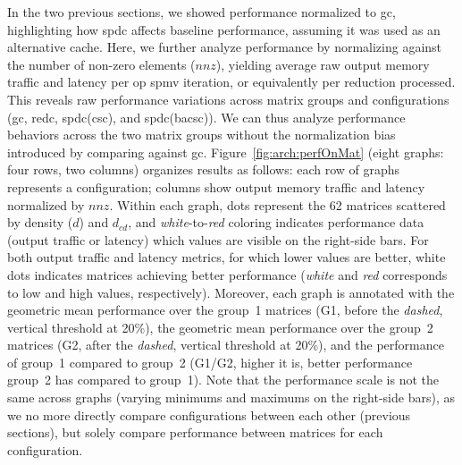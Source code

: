 In the two previous sections, we showed performance normalized to \acrshort{gc}, highlighting how \acrlong{spdc} affects baseline performance, assuming it was used as an alternative cache.
Here, we further analyze performance by normalizing against the number of non-zero elements ($\mathit{nnz}$), yielding average raw output memory traffic and latency per \acrshort{op} \acrshort{spmv} iteration, or equivalently per \gls{reduction} processed.
This reveals raw performance variations across matrix groups and configurations (\acrshort{gc}, \acrshort{redc}, \acrlong{spdc}(\acrshort{csc}), and \acrlong{spdc}(\acrshort{bacsc})).
We can thus analyze performance behaviors across the two matrix groups without the normalization bias introduced by comparing against \acrshort{gc}.
Figure~\ref{fig:arch:perfOnMat} (eight graphs: four rows, two columns) organizes results as follows: each row of graphs represents a configuration; columns show output memory traffic and latency normalized by $\mathit{nnz}$.
Within each graph, dots represent the 62 matrices scattered by density ($d$) and $d_\mathit{cd}$, and \textit{white}-to-\textit{red} coloring indicates performance data (output traffic or latency) which values are visible on the right-side bars.
For both output traffic and latency metrics, for which lower values are better, white dots indicates matrices achieving better performance (\textit{white} and \textit{red} corresponds to low and high values, respectively).
Moreover, each graph is annotated with the geometric mean performance over the group~1 matrices (G1, before the \textit{dashed}, vertical threshold at 20\%), the geometric mean performance over the group~2 matrices (G2, after the \textit{dashed}, vertical threshold at 20\%), and the performance of group~1 compared to group~2 (G1/G2, higher it is, better performance group~2 has compared to group~1).
Note that the performance scale is not the same across graphs (varying minimums and maximums on the right-side bars), as we no more directly compare configurations between each other (previous sections), but solely compare performance between matrices for each configuration.

